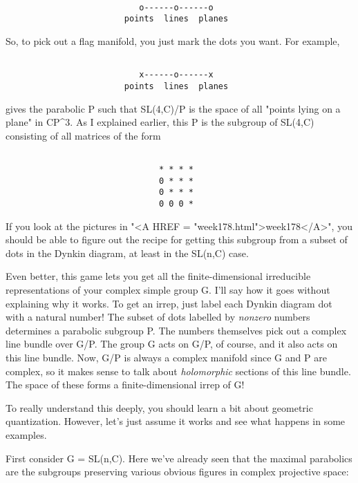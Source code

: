 \begin{verbatim}

                           o------o------o
                        points  lines  planes       
\end{verbatim}
    
So, to pick out a flag manifold, you just mark the dots you want.  
For example, 


\begin{verbatim}

                           x------o------x
                        points  lines  planes       
\end{verbatim}
    
gives the parabolic P such that SL(4,C)/P is the space of all "points
lying on a plane" in CP^{3}.  As I explained earlier, 
this P is the 
subgroup of SL(4,C) consisting of all matrices of the form


\begin{verbatim}

                               * * * *
                               0 * * *          
                               0 * * *
                               0 0 0 *
\end{verbatim}
    
If you look at the pictures in "<A HREF = "week178.html">week178</A>", you should be able to figure
out the recipe for getting this subgroup from a subset of dots in the 
Dynkin diagram, at least in the SL(n,C) case.

Even better, this game lets you get all the finite-dimensional irreducible 
representations of your complex simple group G.  I'll say how it goes
without explaining why it works.  To get an irrep, just label each
Dynkin diagram dot with a natural number!  The subset of dots labelled
by \emph{nonzero} numbers determines a parabolic subgroup P.  The numbers
themselves pick out a complex line bundle over G/P.  The group G acts
on G/P, of course, and it also acts on this line bundle.  Now, G/P is 
always a complex manifold since G and P are complex, so it makes sense
to talk about \emph{holomorphic} sections of this line bundle.  The space
of these forms a finite-dimensional irrep of G!  

To really understand this deeply, you should learn a bit about geometric
quantization.  However, let's just assume it works and see what happens
in some examples.  

First consider G = SL(n,C).  Here we've already seen that the maximal 
parabolics are the subgroups preserving various obvious figures in 
complex projective space:


